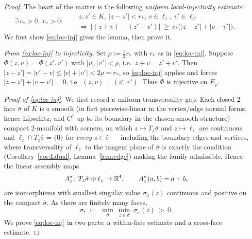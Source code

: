 \begin{proof}
The heart of the matter is the following \emph{uniform local-injectivity estimate}:
\begin{equation}\label{eq:loc-inj}
\exists\,c_\ast>0,\ r_\ast>0:\quad
\begin{aligned}
&z,z'\in K,\ |z-z'|<r_\ast,\ v\in\ell_z,\ v'\in\ell_{z'}\\
&\Longrightarrow\
|(z+v)-(z'+v')|\ \ge\ c_\ast\bigl(|z-z'|+|v-v'|\bigr).
\end{aligned}
\end{equation}
We first show \eqref{eq:loc-inj} gives the lemma, then prove it.

\emph{From \eqref{eq:loc-inj} to injectivity.} Set $\rho:=\tfrac12 r_\ast$ with
$r_\ast$ as in \eqref{eq:loc-inj}. Suppose $\Phi(z,v)=\Phi(z',v')$ with $|v|,|v'|<\rho$,
i.e.\ $z+v=z'+v'$. Then $|z-z'|=|v'-v|\le|v|+|v'|<2\rho=r_\ast$, so \eqref{eq:loc-inj}
applies and forces $|z-z'|+|v-v'|=0$, i.e.\ $(z,v)=(z',v')$. Thus $\Phi$ is injective
on $E_\rho$.

\emph{Proof of \eqref{eq:loc-inj}.} We first record a uniform transversality gap.
Each closed $2$-face $\bar\sigma$ of $K$ is a smooth (in fact piecewise-linear in the
vertex/edge normal forms, hence Lipschitz, and $C^1$ up to its boundary in the chosen
smooth structure) compact $2$-manifold with corners, on which $z\mapsto T_z\bar\sigma$
and $z\mapsto\ell_z$ are continuous and $\ell_z\cap T_z\bar\sigma=\{0\}$ for
\emph{every} $z\in\bar\sigma$ --- including the boundary edges and vertices, where
transversality of $\ell_z$ to the tangent plane of $\bar\sigma$ is exactly the
condition (Corollary~\ref{cor:Ldual}, Lemma~\ref{lem:edge}) making the family
admissible. Hence the linear assembly maps
\[
A^{\bar\sigma}_z\colon T_z\bar\sigma\oplus\ell_z\to\mathbb{R}^4,\qquad A^{\bar\sigma}_z(a,b)=a+b,
\]
are isomorphisms with smallest singular value $\sigma_{\bar\sigma}(z)$ continuous and
positive on the compact $\bar\sigma$. As there are finitely many faces,
\[
\sigma_\ast\ :=\ \min_{\bar\sigma}\ \min_{z\in\bar\sigma}\ \sigma_{\bar\sigma}(z)\ >\ 0 .
\]
We prove \eqref{eq:loc-inj} in two parts: a within-face estimate and a cross-face
estimate.


\end{proof}
